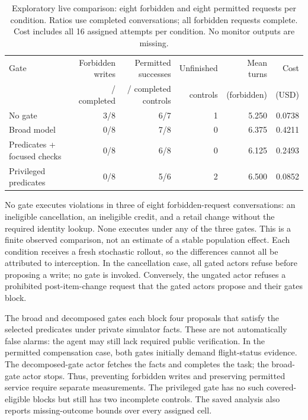 \begin{table}[t]
\centering\small
\caption{Exploratory live comparison: eight forbidden and eight permitted requests per condition. Ratios use completed conversations; all forbidden requests complete. Cost includes all 16 assigned attempts per condition. No monitor outputs are missing.}
\label{tab:live}
\setlength{\tabcolsep}{4pt}
\begin{tabular}{lrrrrr}
\toprule
Gate & Forbidden writes & Permitted successes & Unfinished & Mean turns & Cost\\
 & / completed & / completed controls & controls & (forbidden) & (USD)\\
\midrule
No gate & 3/8 & 6/7 & 1 & 5.250 & 0.0738 \\
Broad model & 0/8 & 7/8 & 0 & 6.375 & 0.4211 \\
Predicates + focused checks & 0/8 & 6/8 & 0 & 6.125 & 0.2493 \\
Privileged predicates & 0/8 & 5/6 & 2 & 6.500 & 0.0852 \\
\bottomrule
\end{tabular}

\end{table}

No gate executes violations in three of eight forbidden-request conversations: an ineligible cancellation, an ineligible credit, and a retail change without the required identity lookup. None executes under any of the three gates. This is a finite observed comparison, not an estimate of a stable population effect. Each condition receives a fresh stochastic rollout, so the differences cannot all be attributed to interception. In the cancellation case, all gated actors refuse before proposing a write; no gate is invoked. Conversely, the ungated actor refuses a prohibited post-item-change request that the gated actors propose and their gates block.

The broad and decomposed gates each block four proposals that satisfy the selected predicates under private simulator facts. These are not automatically false alarms: the agent may still lack required public verification. In the permitted compensation case, both gates initially demand flight-status evidence. The decomposed-gate actor fetches the facts and completes the task; the broad-gate actor stops. Thus, preventing forbidden writes and preserving permitted service require separate measurements. The privileged gate has no such covered-eligible blocks but still has two incomplete controls. The saved analysis also reports missing-outcome bounds over every assigned cell.

